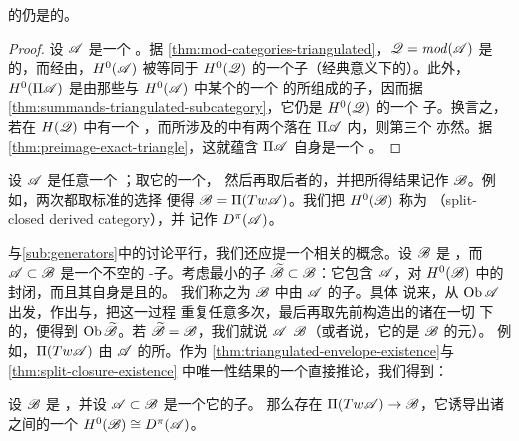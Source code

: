 \begin{lemma}\label{thm:split-closure-triangulated}
\trTriangulated{} \trACategory{}的\trSplitClosure{}仍是\trTriangulated{}的。
\end{lemma}
\begin{proof}
设 $\mathscr{A}$ 是一个\trTriangulated{} \trACategory。据%
\cref{thm:mod-categories-triangulated}，$\mathscr{Q}=\mathit{mod}(\mathscr{A})$ 是%
\trTriangulated{}的，而经由\trYonedaEmbedding，$H^0(\mathscr{A})$ 被等同于
$H^0(\mathscr{Q})$ 的一个\trTriangulated{}子\trCategory（经典意义下的）。此外，
$H^0(\Pi\mathscr{A})$ 是由那些与 $H^0(\mathscr{A})$ 中某个\trObject{}的一个%
\trDirectSummand{}\trIsomorphic{}的\trObject{}所组成的子\trCategory，因而据%
\cref{thm:summands-triangulated-subcategory}，它仍是 $H^0(\mathscr{Q})$ 的一个%
\trTriangulated{}子\trCategory。换言之，若在 $H(\mathscr{Q})$ 中有一个%
\trExactTriangle，而所涉及的\trObject{}中有两个落在 $\Pi\mathscr{A}$ 内，则第三个
亦然。据\cref{thm:preimage-exact-triangle}，这就蕴含 $\Pi\mathscr{A}$ 自身是一个%
\trTriangulated{} \trACategory。
\end{proof}

设 $\mathscr{A}$ 是任意一个 \trACategory；取它的一个\trTriangulated\trEnvelope，
然后再取后者的\trSplitClosure，并把所得结果记作 $\mathscr{B}$。例如，两次都取标准的选择
便得 $\mathscr{B}=\Pi(Tw\mathscr{A})$。我们把 $H^0(\mathscr{B})$ 称为\textbf{%
\trSplitClosed{}\trDerivedCategory}（split-closed derived category），并
记作 $D^\pi(\mathscr{A})$。

与\cref{sub:generators}中的讨论平行，我们还应提一个相关的概念。设 $\mathscr{B}$
是\trSplitClosed{} \trTriangulated{} \trACategory，而 $\mathscr{A}\subset\mathscr{B}$
是一个不空的\trFull{} \trAinfty-子\trCategory。考虑最小的\trFull{}子\trCategory{}%
$\widetilde{\mathscr{B}}\subset\mathscr{B}$：它包含 $\mathscr{A}$，对 $H^0(\mathscr{B})$ 中的%
\trIsomorphism{}封闭，而且其自身是\trTriangulated{}且\trSplitClosed{}的。
我们称之为 $\mathscr{B}$ 中由 $\mathscr{A}$ \trSplitGeneration{}的子\trCategory。具体
说来，从 $\operatorname{Ob}\mathscr{A}$ 出发，作出\trMappingCone{}与\trSuspension，把这一过程
重复任意多次，最后再取先前构造出的诸\trObject{}在一切\trIdempotent{}%
\trEndomorphism{}下的\trImage，便得到 $\operatorname{Ob}\widetilde{\mathscr{B}}$。若
$\widetilde{\mathscr{B}}=\mathscr{B}$，我们就说 $\mathscr{A}$ \emph{\trSplitGeneration}
$\mathscr{B}$（或者说，它的\trObject{}是 $\mathscr{B}$ 的\trSplitGeneration{}元）。
例如，$\Pi(Tw\mathscr{A})$ 由 $\mathscr{A}$ 的\trObject{}所\trSplitGeneration。作为
\cref{thm:triangulated-envelope-existence}与\cref{thm:split-closure-existence}
中唯一性结果的一个直接推论，我们得到：

\begin{corollary}\label{thm:split-generated-equivalence}
设 $\mathscr{B}$ 是\trSplitClosed{} \trTriangulated{} \trACategory，并设
$\mathscr{A}\subset\mathscr{B}$ 是一个\trSplitGeneration{}它的\trFull{}子\trCategory。
那么存在\trQuasiequivalence{} $\Pi(Tw\mathscr{A})\to\mathscr{B}$，它诱导出诸%
\trTriangulated{}\trCategory{}之间的一个\trEquivalence{}%
$H^0(\mathscr{B})\cong D^\pi(\mathscr{A})$。
\noqed
\end{corollary}

